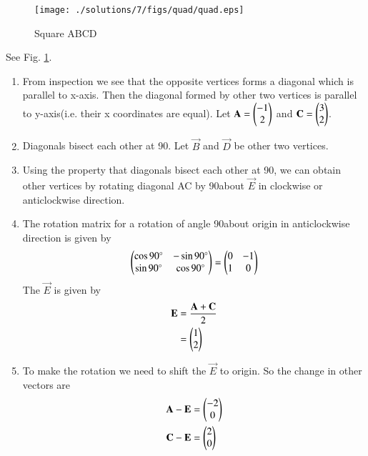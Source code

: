 \begin{figure}[!ht]
\centering
\texttt{[image: ./solutions/7/figs/quad/quad.eps]}
\caption{Square ABCD}
\label{fig:2.2.7}
\end{figure}
See Fig. \ref{fig:2.2.7}.

\begin{enumerate}
\item From inspection we see that the opposite vertices forms a diagonal which is parallel to x-axis. Then the diagonal formed by other two vertices is parallel to y-axis(i.e. their x coordinates are equal). Let $\mathbf{A}= \begin{pmatrix}-1\\2\end{pmatrix}$  and $\mathbf{C}=\begin{pmatrix}3\\2\end{pmatrix}$. 

\item Diagonals bisect each other at 90\degree.
Let $\vec{B}$ and $\vec{D}$ be other two vertices. 
\item Using the property that diagonals bisect each other at 90\degree, we can obtain other vertices by rotating diagonal AC by 90\degree about $\vec{E}$ in clockwise or anticlockwise direction.

\item The rotation matrix for a rotation of angle 90\degree about origin in anticlockwise direction is given by
\begin{align}
\begin{pmatrix}\cos90\degree&-\sin90\degree\\\sin90\degree&\cos90\degree\end{pmatrix}=\begin{pmatrix}0&-1\\1&0\end{pmatrix}
\end{align}
The $\vec{E}$ is given by
\begin{align}
\mathbf{E}&= \frac{\mathbf{A}+\mathbf{C}}{2} \\
&= \begin{pmatrix}1\\2\end{pmatrix}
\end{align}

\item To make the rotation we need to shift the $\vec{E}$ to origin. So the change in other vectors are
\begin{align}
\mathbf{A}-\mathbf{E}&=\begin{pmatrix}-2\\0\end{pmatrix}\\
\mathbf{C}-\mathbf{E}&=\begin{pmatrix}2\\0\end{pmatrix}
\end{align}


\end{enumerate}
